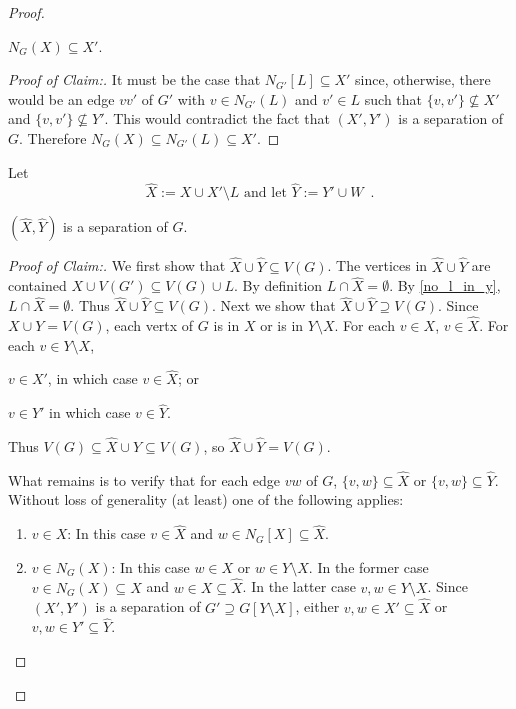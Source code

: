 \documentclass{patmorin}
\newenvironment{clmproof}{\begin{proof}[Proof of Claim:]\renewcommand{\qedsymbol}{\rule{1ex}{1ex}}}{\end{proof}}
\begin{document}
\begin{proof}
  \begin{clm}
    $N_G(X)\subseteq X'$.
  \end{clm}

  \begin{clmproof}
    It must be the case that $N_{G'}[L]\subseteq X'$ since, otherwise, there would be an edge $vv'$ of $G'$ with $v\in N_{G'}(L)$ and $v'\in L$ such that $\{v,v'\}\not\subseteq X'$ and $\{v,v'\}\not\subseteq Y'$.  This would contradict the fact that $(X',Y')$ is a separation of $G$.
    Therefore $N_G(X)\subseteq N_{G'}(L)\subseteq X'$.
  \end{clmproof}

  Let
  \[
    \widehat{X}:=X\cup X'\setminus L \text{ and let } \widehat{Y}:=Y'\cup W \enspace .
  \]
  \begin{clm}
    $(\widehat{X},\widehat{Y})$ is a separation of $G$.
  \end{clm}

  \begin{clmproof}
    We first show that $\widehat{X}\cup\widehat{Y}\subseteq V(G)$.
    The vertices in $\widehat{X}\cup\widehat{Y}$ are contained $X\cup V(G')\subseteq V(G)\cup L$.
    By definition $L\cap \widehat{X}=\emptyset$. By \cref{no_l_in_y}, $L\cap \widehat{X}=\emptyset$. Thus $\widehat{X}\cup\widehat{Y}\subseteq V(G)$.
    Next we show that $\widehat{X}\cup\widehat{Y}\supseteq V(G)$.  Since $X\cup Y=V(G)$, each vertx of $G$ is in $X$ or is in $Y\setminus X$.
    For each $v\in X$, $v\in \widehat{X}$.  For each $v\in Y\setminus X$,
    \begin{enumerate*}[label=(\alph*)]
      \item $v\in X'$, in which case $v\in \widehat{X}$;
      or \item $v\in Y'$ in which case $v\in\widehat{Y}$.
    \end{enumerate*}
    Thus $V(G)\subseteq \widehat{X}\cup\widehat{Y}\subseteq V(G)$, so $\widehat{X}\cup\widehat{Y}= V(G)$.

    What remains is to verify that for each edge $vw$ of $G$, $\{v,w\}\subseteq \widehat{X}$ or $\{v,w\}\subseteq\widehat{Y}$.
    Without loss of generality (at least) one of the following applies:
    \begin{enumerate}[nosep,nolistsep,label=(\roman*)]
      \item $v\in X$: In this case $v\in\widehat{X}$ and $w\in N_G[X]\subseteq\widehat{X}$.
      \item $v\in N_G(X)$: In this case $w\in X$ or $w\in Y\setminus X$.  In the former case $v\in N_G(X)\subseteq X$ and $w\in X\subseteq \widehat{X}$. In the latter case $v,w\in Y\setminus X$.  Since $(X',Y')$ is a separation of $G'\supseteq G[Y\setminus X]$, either $v,w\in X'\subseteq \widehat{X}$ or $v,w\in Y'\subseteq\widehat{Y}$. \qedhere
    \end{enumerate}
  \end{clmproof}


\end{proof}
\end{document}
